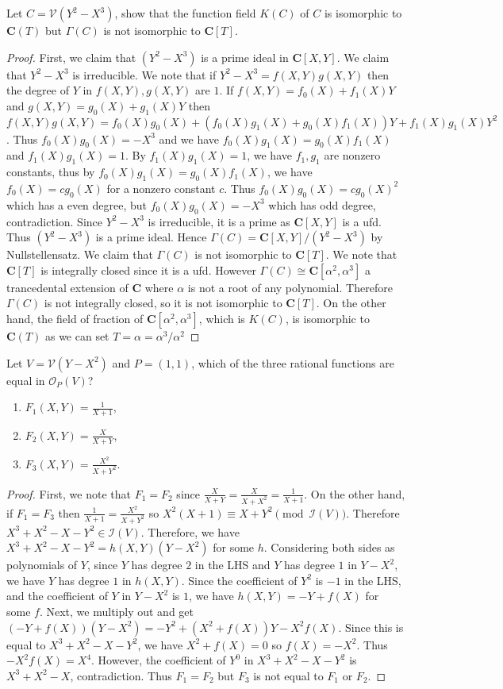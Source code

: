 \documentclass[11pt]{book}
\begin{document}
\begin{problem}Let $C=\mathcal{V}(Y^2-X^3)$, show that the function field $K(C)$ of $C$ is isomorphic to $\mathbf C(T)$ but $\Gamma(C)$ is not isomorphic to $\mathbf C[T]$.
\begin{proof}
First, we claim that $(Y^2-X^3)$ is a prime ideal in $\mathbf C[X,Y]$. We claim that $Y^2-X^3$ is irreducible. We note that if $Y^2-X^3=f(X,Y)g(X,Y)$ then the degree of $Y$ in $f(X,Y),g(X,Y)$ are $1$. If $f(X,Y)=f_0(X)+f_1(X)Y$ and $g(X,Y)=g_0(X)+g_1(X)Y$ then $f(X,Y)g(X,Y)=f_0(X)g_0(X)+(f_0(X)g_1(X)+g_0(X)f_1(X))Y+f_1(X)g_1(X)Y^2$. Thus $f_0(X)g_0(X)=-X^3$ and we have $f_0(X)g_1(X)=g_0(X)f_1(X)$ and $f_1(X)g_1(X)=1$. By $f_1(X)g_1(X)=1$, we have $f_1,g_1$ are nonzero constants, thus by $f_0(X)g_1(X)=g_0(X)f_1(X)$, we have $f_0(X)=cg_0(X)$ for a nonzero constant $c$. Thus $f_0(X)g_0(X)=cg_0(X)^2$ which has a even degree, but $f_0(X)g_0(X)=-X^3$ which has odd degree, contradiction. Since $Y^2-X^3$ is irreducible, it is a prime as $\mathbf C[X,Y]$ is a ufd. Thus $(Y^2-X^3)$ is a prime ideal. Hence $\Gamma(C)=\mathbf C[X,Y]/(Y^2-X^3)$ by Nullstellensatz. We claim that $\Gamma(C)$ is not isomorphic to $\mathbf C[T]$. We note that $\mathbf C[T]$ is integrally closed since it is a ufd. However $\Gamma(C)\cong \mathbf C[\alpha^2,\alpha^3]$ a trancedental extension of $\mathbf C$ where $\alpha$ is not a root of any polynomial. Therefore $\Gamma(C)$ is not integrally closed, so it is not isomorphic to $\mathbf C[T]$. On the other hand, the field of fraction of $\mathbf C[\alpha^2,\alpha^3]$, which is $K(C)$, is isomorphic to $\mathbf C(T)$ as we can set $T=\alpha=\alpha^3/\alpha^2$
\end{proof}
\end{problem}
\begin{problem}Let $V=\mathcal{V}(Y-X^2)$ and $P=(1,1)$, which of the three rational functions are equal in $\mathcal{O}_P(V)$?
\begin{enumerate}
	\item $F_1(X,Y)=\frac{1}{X+1}$,
	\item $F_2(X,Y)=\frac{X}{X+Y}$,
	\item $F_3(X,Y)=\frac{X^2}{X+Y^2}$.
\end{enumerate}
\begin{proof}
First, we note that $F_1=F_2$ since $\frac{X}{X+Y}=\frac{X}{X+X^2}=\frac{1}{X+1}$. On the other hand, if $F_1=F_3$ then $\frac{1}{X+1}= \frac{X^2}{X+Y^2}$ so $X^2(X+1)\equiv X+Y^2\pmod{\mathcal{I}(V)}$. Therefore $X^3+X^2-X-Y^2\in \mathcal{I}(V)$. Therefore, we have $X^3+X^2-X-Y^2=h(X,Y)(Y-X^2)$ for some $h$. Considering both sides as polynomials of $Y$, since $Y$ has degree $2$ in the LHS and $Y$ has degree $1$ in $Y-X^2$, we have $Y$ has degree $1$ in $h(X,Y)$. Since the coefficient of $Y^2$ is $-1$ in the LHS, and the coefficient of $Y$ in $Y-X^2$ is $1$, we have $h(X,Y)=-Y+f(X)$ for some $f$. Next, we multiply out and get $(-Y+f(X))(Y-X^2)=-Y^2+(X^2+f(X))Y-X^2f(X)$. Since this is equal to $X^3+X^2-X-Y^2$, we have $X^2+f(X)=0$ so $f(X)=-X^2$. Thus $-X^2f(X)=X^4$. However, the coefficient of $Y^0$ in $X^3+X^2-X-Y^2$ is $X^3+X^2-X$, contradiction. Thus $F_1=F_2$ but $F_3$ is not equal to $F_1$ or $F_2$.
\end{proof}
\end{problem}
\end{document}
